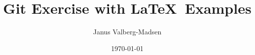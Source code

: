 \documentclass[10pt,a4paper]{article}
\title{Git Exercise with \LaTeX\ Examples}
\author{Janus Valberg-Madsen}
\date{\today}
\begin{document}
\maketitle

\begin{abstract}
  
\end{abstract}

\tableofcontents



\end{document}
